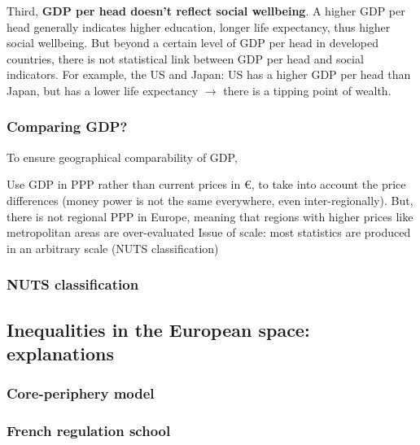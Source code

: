 \documentclass{article}
\begin{document}
Third, \textbf{GDP per head doesn't reflect social wellbeing}. A higher GDP per head generally indicates higher education, longer life expectancy, thus higher social wellbeing. But beyond a certain level of GDP per head in developed countries, there is not statistical link between GDP per head and social indicators. 
For example, the US and Japan: US has a higher GDP per head than Japan, but has a lower life expectancy $\rightarrow$ there is a tipping point of wealth.

\subsubsection{Comparing GDP?}

To ensure geographical comparability of GDP,

\begin{outline}
	\1 Use GDP in PPP rather than current prices in €, to take into account the price differences (money power is not the same everywhere, even inter-regionally). But, there is not regional PPP in Europe, meaning that regions with higher prices like metropolitan areas are over-evaluated
	\1 Issue of scale: most statistics are produced in an arbitrary scale (NUTS classification)
	
\end{outline}

\subsubsection{NUTS classification}

\subsection{Inequalities in the European space: explanations}

\begin{outline}
	\1
\end{outline}


\subsubsection{Core-periphery model}


\begin{outline}
	\1
\end{outline}

\subsubsection{French regulation school}
\end{document}
